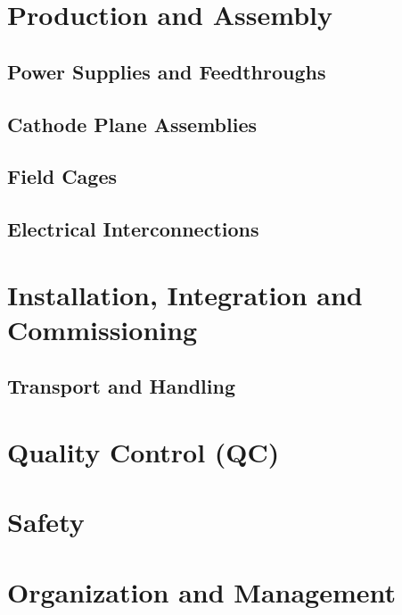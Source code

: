 \section{Production and Assembly}
\label{sec:fdsp-hv-prod-assy}

\subsection{Power Supplies and Feedthroughs}
\label{sec:fdsp-hv-supplies-feedthroughs}

\subsection{Cathode Plane Assemblies}
\label{sec:fdsp-hv-prod-cpa}

\subsection{Field Cages}
\label{sec:fdsp-hv-prod-fc}

\subsection{Electrical Interconnections}
\label{sec:fdsp-hv-prod-interconnect}

\section{Installation, Integration and Commissioning}
\label{sec:fdsp-hv-install}

\subsection{Transport and Handling}
\label{sec:fdsp-hv-install-transport}

\section{Quality Control (QC)}
\label{sec:fdsp-hv-qc}

\section{Safety}
\label{sec:fdsp-hv-safety}

\section{Organization and Management}
\label{sec:fdsp-hv-org}



